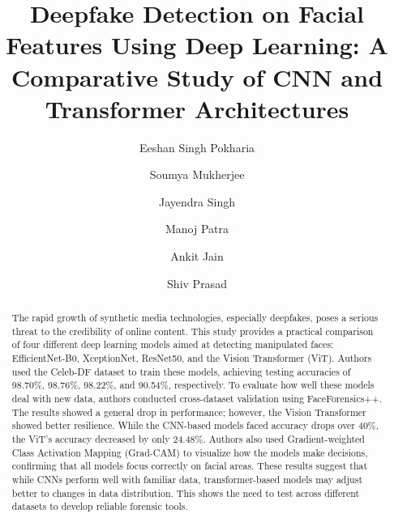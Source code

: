 \documentclass[runningheads]{llncs}
\begin{document}

\title{Deepfake Detection on Facial Features Using Deep Learning: A Comparative Study of CNN and Transformer Architectures}

\author{Eeshan Singh Pokharia\orcidID{} \and
Soumya Mukherjee\orcidID{} \and
Jayendra Singh\orcidID{} \and
Manoj Patra\orcidID{} \and
Ankit Jain\orcidID{} \and
Shiv Prasad\orcidID{}}


\maketitle

\begin{abstract}
The rapid growth of synthetic media technologies, especially deepfakes, poses a serious threat to the credibility of online content. This study provides a practical comparison of four different deep learning models aimed at detecting manipulated faces: EfficientNet-B0, XceptionNet, ResNet50, and the Vision Transformer (ViT). Authors used the Celeb-DF dataset to train these models, achieving testing accuracies of 98.70\%, 98.76\%, 98.22\%, and 90.54\%, respectively. To evaluate how well these models deal with new data, authors conducted cross-dataset validation using FaceForensics++. The results showed a general drop in performance; however, the Vision Transformer showed better resilience. While the CNN-based models faced accuracy drops over 40\%, the ViT's accuracy decreased by only 24.48\%. Authors also used Gradient-weighted Class Activation Mapping (Grad-CAM) to visualize how the models make decisions, confirming that all models focus correctly on facial areas. These results suggest that while CNNs perform well with familiar data, transformer-based models may adjust better to changes in data distribution. This shows the need to test across different datasets to develop reliable forensic tools.
\end{abstract}

\end{document}
